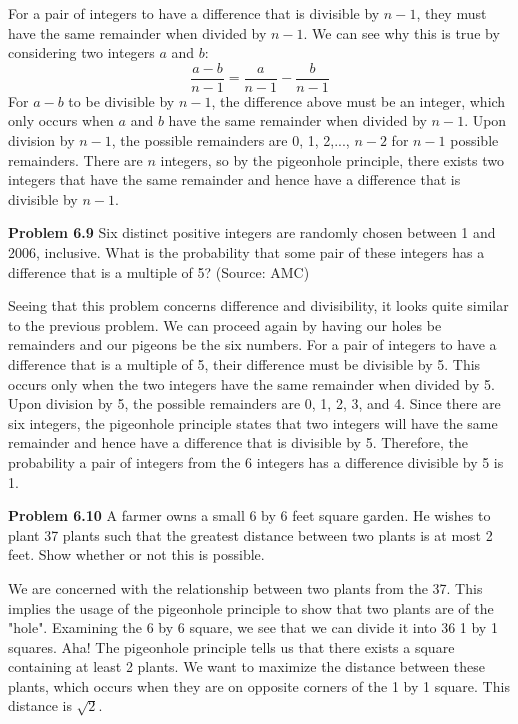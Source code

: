 \documentclass[11pt]{scrartcl}
\DeclarePairedDelimiter
\begin{document}
\noindent
For a pair of integers to have a difference that is divisible by $n-1$, they must have the same remainder when divided by $n-1$. We can see why this is true by considering two integers $a$ and $b$:
$$\frac{a-b}{n-1}=\frac{a}{n-1}-\frac{b}{n-1}$$
For $a-b$ to be divisible by $n-1$, the difference above must be an integer, which only occurs when $a$ and $b$ have the same remainder when divided by $n-1$. Upon division by $n-1$, the possible remainders are 0, 1, 2,..., $n-2$ for $n-1$ possible remainders. There are $n$ integers, so by the pigeonhole principle, there exists two integers that have the same remainder and hence have a difference that is divisible by $n-1$. 
\\
\begin{tcolorbox}
\textbf{Problem 6.9} Six distinct positive integers are randomly chosen between 1 and 2006, inclusive. What is the probability that some pair of these integers has a difference that is a multiple of 5? (Source: AMC)
\end{tcolorbox}
Seeing that this problem concerns difference and divisibility, it looks quite similar to the previous problem. We can proceed again by having our holes be remainders and our pigeons be the six numbers. For a pair of integers to have a difference that is a multiple of 5, their difference must be divisible by 5. This occurs only when the two integers have the same remainder when divided by 5. Upon division by 5, the possible remainders are 0, 1, 2, 3, and 4. Since there are six integers, the pigeonhole principle states that two integers will have the same remainder and hence have a difference that is divisible by 5. Therefore, the probability a pair of integers from the 6 integers has a difference divisible by 5 is 1.
\\
\begin{tcolorbox}
\textbf{Problem 6.10} A farmer owns a small 6 by 6 feet square garden. He wishes to plant 37 plants such that the greatest distance between two plants is at most 2 feet. Show whether or not this is possible. 
\end{tcolorbox}
We are concerned with the relationship between two plants from the 37. This implies the usage of the pigeonhole principle to show that two plants are of the "hole". Examining the 6 by 6 square, we see that we can divide it into 36 1 by 1 squares. Aha! The pigeonhole principle tells us that there exists a square containing at least 2 plants. We want to maximize the distance between these plants, which occurs when they are on opposite corners of the 1 by 1 square. This distance is $\sqrt{2}$.
\end{document}
